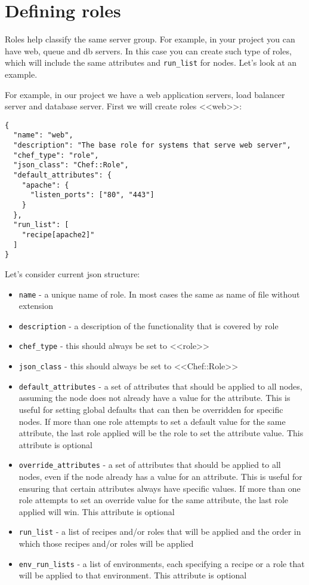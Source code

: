 \section{Defining roles}
\label{sec:solo-role}

Roles help classify the same server group. For example, in your project you can have web, queue and db servers. In this case you can create such type of roles, which will include the same attributes and \lstinline!run_list! for nodes. Let's look at an example.

For example, in our project we have a web application servers, load balancer server and database server. First we will create roles <<web>>:

\begin{lstlisting}[label=lst:my-cloud-role1,title=my-cloud/roles/web.json]
{
  "name": "web",
  "description": "The base role for systems that serve web server",
  "chef_type": "role",
  "json_class": "Chef::Role",
  "default_attributes": {
    "apache": {
      "listen_ports": ["80", "443"]
    }
  },
  "run_list": [
    "recipe[apache2]"
  ]
}
\end{lstlisting}

Let's consider current json structure:

\begin{itemize}
  \item \lstinline!name! - a unique name of role. In most cases the same as name of file without extension
  \item \lstinline!description! - a description of the functionality that is covered by role
  \item \lstinline!chef_type! - this should always be set to <<role>>
  \item \lstinline!json_class! - this should always be set to <<Chef::Role>>
  \item \lstinline!default_attributes! - a set of attributes that should be applied to all nodes, assuming the node does not already have a value for the attribute. This is useful for setting global defaults that can then be overridden for specific nodes. If more than one role attempts to set a default value for the same attribute, the last role applied will be the role to set the attribute value. This attribute is optional
  \item \lstinline!override_attributes! - a set of attributes that should be applied to all nodes, even if the node already has a value for an attribute. This is useful for ensuring that certain attributes always have specific values. If more than one role attempts to set an override value for the same attribute, the last role applied will win. This attribute is optional
  \item \lstinline!run_list! - a list of recipes and/or roles that will be applied and the order in which those recipes and/or roles will be applied
  \item \lstinline!env_run_lists! - a list of environments, each specifying a recipe or a role that will be applied to that environment. This attribute is optional
\end{itemize}

